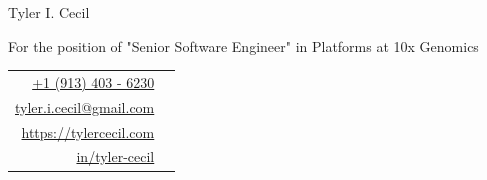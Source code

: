 \documentclass[sans, a4paper, 11pt]{article}
\newcommand{\cvcolor}[1]{{\color{MidnightBlue}#1}}
\begin{document}
\noindent
\begin{minipage}{0.6\linewidth}
 {
 \fontsize{40pt}{50pt}\selectfont
 \noindent
 {Tyler I. Cecil}}\\
 {\Large \color{darkgray} {
   \vspace{-0.75em}

   \noindent
   For the position of "Senior Software Engineer" in Platforms at 10x Genomics
 }}
\end{minipage}
\hfill
{
\begin{tabular}{|rl}
  \href{tel:+1 (913) 403 - 6230}{+1 (913) 403 - 6230}&\cvcolor{\faPhone} \\
  \href{mailto:tyler.i.cecil@gmail.com}{tyler.i.cecil@gmail.com}&\cvcolor{\faEnvelope} \\
  \href{https://tylercecil.com}{https://tylercecil.com}&\cvcolor{\faGlobe} \\
  \href{https://linkedin.com/in/tyler-cecil}{in/tyler-cecil}& \cvcolor{\faLinkedinSquare}\\
\end{tabular}
}

\vspace{0.5em}
\hline
\vspace{1.5em}
\end{document}
